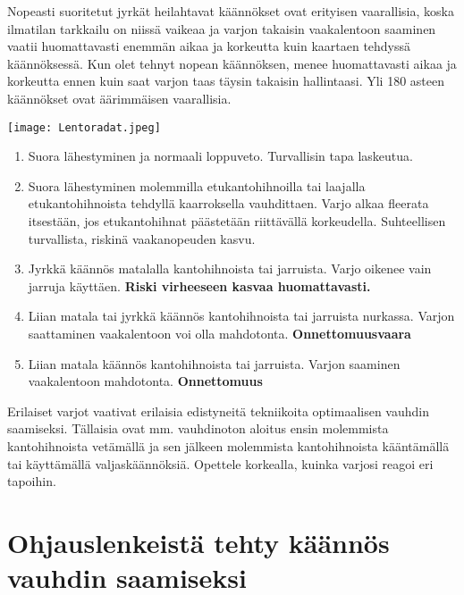 Nopeasti suoritetut jyrkät heilahtavat käännökset ovat erityisen vaarallisia, koska ilmatilan tarkkailu on niissä vaikeaa ja varjon takaisin vaakalentoon saaminen vaatii huomattavasti enemmän aikaa ja korkeutta kuin kaartaen tehdyssä käännöksessä. Kun olet tehnyt nopean käännöksen, menee huomattavasti aikaa ja korkeutta ennen kuin saat varjon taas täysin takaisin hallintaasi. Yli 180 asteen käännökset ovat äärimmäisen vaarallisia. 


\begin{Figure}\centering\texttt{[image: Lentoradat.jpeg]}\end{Figure}  

\begin{enumerate}[label=\bfseries \arabic*)]
\item  Suora lähestyminen ja normaali loppuveto. Turvallisin tapa laskeutua. 
\item  Suora lähestyminen molemmilla etukantohihnoilla tai laajalla etukantohihnoista tehdyllä kaarroksella vauhdittaen. Varjo alkaa fleerata itsestään, jos etukantohihnat päästetään riittävällä korkeudella. Suhteellisen turvallista, riskinä vaakanopeuden kasvu.  
\item  Jyrkkä käännös matalalla kantohihnoista tai jarruista. Varjo oikenee vain jarruja käyttäen. \textbf{Riski virheeseen kasvaa huomattavasti.} 
\item  Liian matala tai jyrkkä käännös kantohihnoista tai jarruista nurkassa. Varjon saattaminen vaakalentoon voi olla mahdotonta. \textbf{Onnettomuusvaara} 
\item  Liian matala käännös kantohihnoista tai jarruista. Varjon saaminen vaakalentoon mahdotonta. \textbf{Onnettomuus} 
\end{enumerate}

Erilaiset varjot vaativat erilaisia edistyneitä tekniikoita optimaalisen vauhdin saamiseksi. Tällaisia ovat mm. vauhdinoton aloitus ensin molemmista kantohihnoista vetämällä ja sen jälkeen molemmista kantohihnoista kääntämällä tai käyttämällä valjaskäännöksiä. Opettele korkealla, kuinka varjosi reagoi eri tapoihin.  

\section{ Ohjauslenkeistä tehty käännös vauhdin saamiseksi }
\label{laskeutumistekniikat-ohjauslenkeista-tehty-kaannos-vauhdin-saamiseksi}


